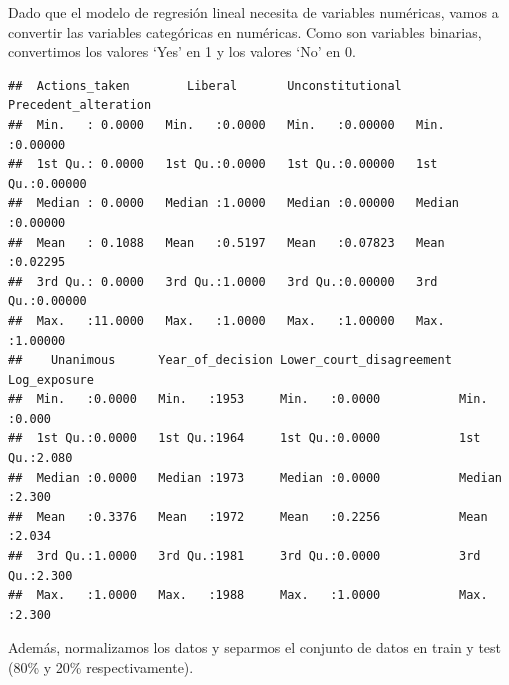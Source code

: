 \documentclass[
]{article}
\begin{document}
Dado que el modelo de regresión lineal necesita de variables numéricas,
vamos a convertir las variables categóricas en numéricas. Como son
variables binarias, convertimos los valores `Yes' en 1 y los valores
`No' en 0.

\begin{verbatim}
##  Actions_taken        Liberal       Unconstitutional  Precedent_alteration
##  Min.   : 0.0000   Min.   :0.0000   Min.   :0.00000   Min.   :0.00000     
##  1st Qu.: 0.0000   1st Qu.:0.0000   1st Qu.:0.00000   1st Qu.:0.00000     
##  Median : 0.0000   Median :1.0000   Median :0.00000   Median :0.00000     
##  Mean   : 0.1088   Mean   :0.5197   Mean   :0.07823   Mean   :0.02295     
##  3rd Qu.: 0.0000   3rd Qu.:1.0000   3rd Qu.:0.00000   3rd Qu.:0.00000     
##  Max.   :11.0000   Max.   :1.0000   Max.   :1.00000   Max.   :1.00000     
##    Unanimous      Year_of_decision Lower_court_disagreement  Log_exposure  
##  Min.   :0.0000   Min.   :1953     Min.   :0.0000           Min.   :0.000  
##  1st Qu.:0.0000   1st Qu.:1964     1st Qu.:0.0000           1st Qu.:2.080  
##  Median :0.0000   Median :1973     Median :0.0000           Median :2.300  
##  Mean   :0.3376   Mean   :1972     Mean   :0.2256           Mean   :2.034  
##  3rd Qu.:1.0000   3rd Qu.:1981     3rd Qu.:0.0000           3rd Qu.:2.300  
##  Max.   :1.0000   Max.   :1988     Max.   :1.0000           Max.   :2.300
\end{verbatim}

Además, normalizamos los datos y separmos el conjunto de datos en train
y test (80\% y 20\% respectivamente).
\end{document}
